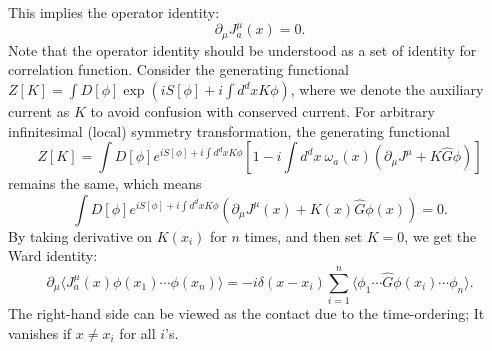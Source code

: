 \documentclass[aps,prb,superscriptaddress,nofootinbib]{revtex4}
\begin{document}
This implies the operator identity:
\begin{equation}
	\partial_\mu J_a^\mu(x) = 0.
\end{equation}
Note that the operator identity should be understood as a set of identity for correlation function.
Consider the generating functional $Z[K] =\int D[\phi] \exp(iS[\phi]+ i \int d^d x K \phi)$, where we denote the auxiliary current as $K$ to avoid confusion with conserved current.
For arbitrary infinitesimal (local) symmetry transformation, the generating functional
\begin{equation}
	Z[K] = \int D[\phi] e^{iS[\phi]+ i \int d^d x K \phi} \left[1-i\int d^d x\ \omega_a(x)\left(\partial_\mu J^\mu + K \hat G \phi \right) \right]
\end{equation}
remains the same, which means
\begin{equation}
	\int D[\phi] e^{iS[\phi]+ i \int d^d x K \phi} \left(\partial_\mu J^\mu(x) + K(x) \hat G \phi(x) \right) = 0.
\end{equation}
By taking derivative on $K(x_i)$ for $n$ times, and then set $K=0$, we get the Ward identity:
\begin{equation}
	\partial_\mu \langle J_a^\mu(x) \phi(x_1) \cdots \phi(x_n)\rangle = -i\delta(x-x_i) \sum_{i=1}^n \langle \phi_1 \cdots \hat G\phi(x_i)\cdots \phi_n\rangle.
\end{equation}
The right-hand side can be viewed as the contact due to the time-ordering;
It vanishes if $x \ne x_i$ for all $i$'s. 
\end{document}
